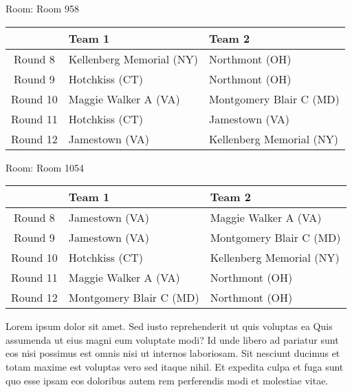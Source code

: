 \documentclass{article}%
\begin{document}
\vspace*{8pt}%
\linebreak%
\begin{flushleft}%
\begin{Large}%
Room: Room 958%
\end{Large}%
\end{flushleft}%
\begin{tabularx}{\textwidth}{|c|Y|Y|}%
\hline%
&Team 1&Team 2\\%
\hline%
Round 8&Kellenberg Memorial (NY)&Northmont (OH)\\%
Round 9&Hotchkiss (CT)&Northmont (OH)\\%
Round 10&Maggie Walker A (VA)&Montgomery Blair C (MD)\\%
Round 11&Hotchkiss (CT)&Jamestown (VA)\\%
Round 12&Jamestown (VA)&Kellenberg Memorial (NY)\\%
\hline%
\end{tabularx}%
\vspace*{8pt}%
\linebreak%
\begin{flushleft}%
\begin{Large}%
Room: Room 1054%
\end{Large}%
\end{flushleft}%
\begin{tabularx}{\textwidth}{|c|Y|Y|}%
\hline%
&Team 1&Team 2\\%
\hline%
Round 8&Jamestown (VA)&Maggie Walker A (VA)\\%
Round 9&Jamestown (VA)&Montgomery Blair C (MD)\\%
Round 10&Hotchkiss (CT)&Kellenberg Memorial (NY)\\%
Round 11&Maggie Walker A (VA)&Northmont (OH)\\%
Round 12&Montgomery Blair C (MD)&Northmont (OH)\\%
\hline%
\end{tabularx}%
\vspace*{8pt}%
\linebreak%
\newline%
Lorem ipsum dolor sit amet. Sed iusto reprehenderit ut quis voluptas ea Quis assumenda ut eius magni eum voluptate modi? Id unde libero ad pariatur sunt eos nisi possimus est omnis nisi ut internos laboriosam. Sit nesciunt ducimus et totam maxime est voluptas vero sed itaque nihil. Et expedita culpa et fuga sunt quo esse ipsam eos doloribus autem rem perferendis modi et molestiae vitae.\newline%
\end{document}
